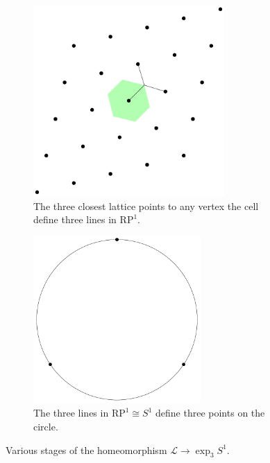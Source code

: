 \documentclass[12pt,twoside]{reedthesis}
\theoremstyle{definition}
\newcommand{\LS}{\mathcal{L}}
\newcommand{\RP}{\mathrm{RP}^1}
\begin{document}
\begin{figure}[t!]
\begin{subfigure}[t]{0.45\textwidth}
    \includegraphics[width=0.8\textwidth]{figures/subset_homeomorphism_step_3.pdf}
    \caption{The three closest lattice points to any vertex the cell define three lines in $\RP$.}
  \end{subfigure}
  \hfill
  \begin{subfigure}[t]{0.45\textwidth}
    \centering
    \includegraphics[width=0.7\textwidth]{figures/subset_homeomorphism_step_4.pdf}
    \caption{The three lines in $\RP \cong S^1$ define three points on the circle.}
  \end{subfigure}
  \caption{Various stages of the homeomorphism $\LS \to \exp_3 S^1$.}
  \label{fig:homeomorphism_to_subset}
\end{figure}
\end{document}
